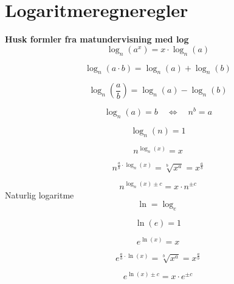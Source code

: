 \section{Logaritmeregneregler}
\textbf{Husk formler fra matundervisning med log}
\[\log_{n}(a^x)=x\cdot \log_{n}(a)\]

\[\log_{n}(a\cdot b)=\log_{n}(a)+\log_{n}(b)\]

\[\log_{n}\left(\frac{a}{b}\right)=\log_{n}(a)-\log_{n}(b)\]

\[\log _n(a)=b \quad \Leftrightarrow \quad n^b=a\]

\[\log_{n}(n)=1\]

\[n^{\log_{n}(x)}=x\]

\[n^{\frac{a}{b}\cdot\log_n(x)}=\sqrt[b]{x^a}=x^{\frac{a}{b}}\]

\[n^{\log_n(x)\pm c}=x\cdot n^{\pm c}\]
Naturlig logaritme
\[\ln=\log_e\]

\[\ln(e)=1\]

\[e^{\ln(x)}=x\]

\[e^{\frac{a}{b}\cdot\ln(x)}=\sqrt[b]{x^a}=x^{\frac{a}{b}}\]

\[e^{\ln(x)\pm c}=x\cdot e^{\pm c}\]




